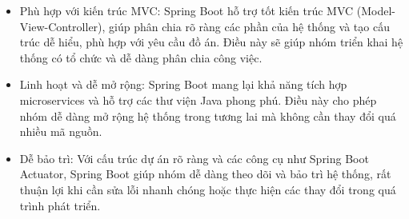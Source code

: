 \begin{enumerate}[(a)]
	      \begin{itemize}
		      \item Phù hợp với kiến trúc MVC: Spring Boot hỗ trợ tốt kiến trúc MVC (Model-View-Controller), giúp phân chia rõ ràng các phần của hệ thống và tạo cấu trúc dễ hiểu, phù hợp với yêu cầu đồ án. Điều này sẽ giúp nhóm triển khai hệ thống có tổ chức và dễ dàng phân chia công việc.
		      \item Linh hoạt và dễ mở rộng: Spring Boot mang lại khả năng tích hợp microservices và hỗ trợ các thư viện Java phong phú. Điều này cho phép nhóm dễ dàng mở rộng hệ thống trong tương lai mà không cần thay đổi quá nhiều mã nguồn.
		      \item Dễ bảo trì: Với cấu trúc dự án rõ ràng và các công cụ như Spring Boot Actuator, Spring Boot giúp nhóm dễ dàng theo dõi và bảo trì hệ thống, rất thuận lợi khi cần sửa lỗi nhanh chóng hoặc thực hiện các thay đổi trong quá trình phát triển.
	      \end{itemize}

\end{enumerate}

